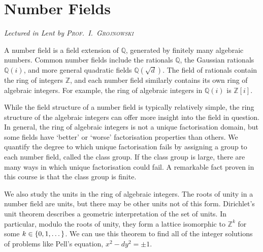 \chapter[Number Fields \\ \textnormal{\emph{Lectured in Lent \oldstylenums{2023} by \textsc{Prof.\ I.\ Grojnowski}}}]{Number Fields}
\emph{\Large Lectured in Lent  by \textsc{Prof.\ I.\ Grojnowski}}

A number field is a field extension of \( \mathbb Q \), generated by finitely many algebraic numbers.
Common number fields include the rationals \( \mathbb Q \), the Gaussian rationals \( \mathbb Q(i) \), and more general quadratic fields \( \mathbb Q(\sqrt{d}) \).
The field of rationals contain the ring of integers \( \mathbb Z \), and each number field similarly contains its own ring of algebraic integers.
For example, the ring of algebraic integers in \( \mathbb Q(i) \) is \( \mathbb Z[i] \).

While the field structure of a number field is typically relatively simple, the ring structure of the algebraic integers can offer more insight into the field in question.
In general, the ring of algebraic integers is not a unique factorisation domain, but some fields have `better' or `worse' factorisation properties than others.
We quantify the degree to which unique factorisation fails by assigning a group to each number field, called the class group.
If the class group is large, there are many ways in which unique factorisation could fail.
A remarkable fact proven in this course is that the class group is finite.

We also study the units in the ring of algebraic integers.
The roots of unity in a number field are units, but there may be other units not of this form.
Dirichlet's unit theorem describes a geometric interpretation of the set of units.
In particular, modulo the roots of unity, they form a lattice isomorphic to \( \mathbb Z^k \) for some \( k \in \qty{0, 1, \dots} \).
We can use this theorem to find all of the integer solutions of problems like Pell's equation, \( x^2 - d y^2 = \pm 1 \).


